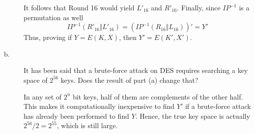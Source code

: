 \documentclass[../hw_sols.tex]{subfiles}
\begin{document}
\begin{description}
\begin{solution}
It follows that Round 16 would yield $L'_{16}$ and $R'_{16}$. Finally, since 
$IP^{-1}$ is a permutation as well
	$$IP^{-1}(R'_{16} \Vert L'_{16}) = (IP^{-1}(R_{16} \Vert L_{16}))' = Y'$$
Thus, proving if $Y = E(K,X)$, then $Y' = E(K',X')$.

\end{solution}
	
\item[b.] It has been said that a brute-force attack on DES requires searching 
a key space of $2^{56}$ keys. Does the result of part (a) change that?

\begin{solution}
In any set of $2^n$ bit keys, half of them are complements of the other half. 
This makes it computationally inexpensive to find $Y'$ if a brute-force attack 
has already been performed to find $Y$. Hence, the true key space is actually 
$2^{56}/2 = 2^{55}$, which is still large.
\end{solution}

\end{description}
\end{document}
